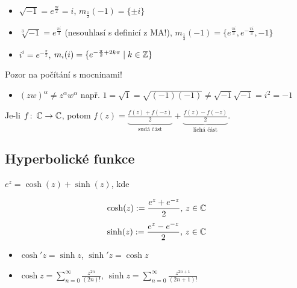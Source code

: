 \newpage
\begin{example}
\mbox{}
\begin{itemize}
    \item $\sqrt{-1}=e^{\frac{\pi i}{2}}=i$,  $m_{\frac{1}{2}}(-1)=\{\pm i\}$
    \item $\sqrt[3]{-1}=e^{\frac{\pi i}{3}}$ (nesouhlasí s definicí z MA!),  $m_{\frac{1}{3}}(-1)=\{e^{\frac{\pi i}{3}},e^{-\frac{\pi i}{3}},-1\} $
    \item  $i^i=e^{-\frac{\pi }{2}}$, 
    $m_{i}(i)=\{e^{-\frac{\pi }{2}+2k\pi}\mid k\in\operatorname{\mathbb{Z}} \}$
\end{itemize}

 \vspace{5mm}
 Pozor na počítání s mocninami!%
 \begin{itemize}
    \item$(zw)^{\alpha}\neq z^{\alpha}w^{\alpha}$ \newline
 např. $1=\sqrt{1}=\sqrt{(-1)(-1)}\neq \sqrt{-1}\sqrt{-1}=i^2=-1$
 \end{itemize}
\end{example}

\begin{note}
Je-li $f \colon \operatorname{\mathbb{C}}   \to \operatorname{\mathbb{C}}  $, potom $f(z)=\underset{\text{sudá část}}{\underbrace{\frac{f(z)+f(-z)}{2}}}+\underset{\text{lichá část}}{\underbrace{\frac{f(z)-f(-z)}{2}}}$.
\end{note}

\subsection{Hyperbolické funkce}

$e^{z}=\cosh(z)+\sinh(z)$, kde

\begin{definition}
\[\cosh(z):=\frac{e^{z}+e^{-z}}{2}\text{, }z\in \operatorname{\mathbb{C}}  \] \newline
\[\sinh(z):=\frac{e^{z}-e^{-z}}{2}\text{, }z\in \operatorname{\mathbb{C}}  \]
\end{definition}


\begin{properties}
\mbox{}
\vspace{-2em}
\begin{itemize}
    \item $\cosh'{z}=\sinh{z}$, $\sinh'{z}=\cosh{z}$
    \item $\cosh{z}=\sum_{n=0}^{\infty}\frac{z^{2n}}{(2n)!}$, $\sinh{z}=\sum_{n=0}^{\infty}\frac{z^{2n+1}}{(2n+1)!}$
\end{itemize}
\end{properties}

